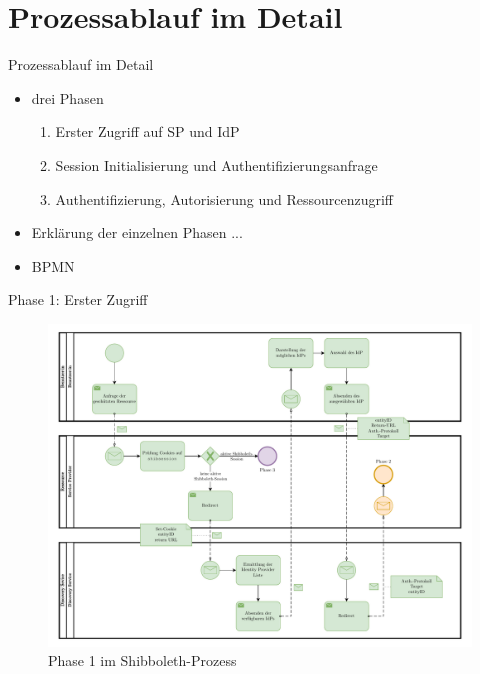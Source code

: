 
\section{Prozessablauf im Detail}

\begin{frame}{Prozessablauf im Detail}
    \begin{itemize}
        \item drei Phasen
        \begin{enumerate}
            \item Erster Zugriff auf SP und IdP
            \item Session Initialisierung und Authentifizierungsanfrage
            \item Authentifizierung, Autorisierung und Ressourcenzugriff~\cite{switchExpertDemoSWITCHaai2024a, shibbolethFlowsAndConfigShibbolethConcepts2019}
        \end{enumerate}
        \item Erklärung der einzelnen Phasen ...
        \item BPMN
    \end{itemize}
\end{frame}


\begin{frame}{Phase 1: Erster Zugriff}
    \begin{figure}
        \includegraphics[height=0.7\paperheight]{../assets/bis_bpmn_phase_1.drawio.pdf}
        \caption{Phase 1 im Shibboleth-Prozess~\cite[vgl.][]{switchExpertDemoSWITCHaai2024a}}
    \end{figure}
\end{frame}


